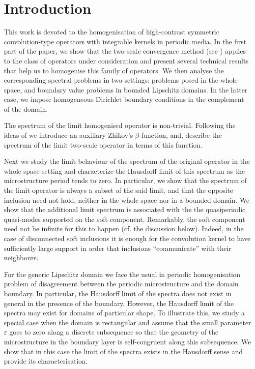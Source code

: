 \documentclass[11pt]{article}
\newcommand\e {\varepsilon}
\theoremstyle{remark}
\begin{document}
\tableofcontents

\section{Introduction}

This work is devoted to the homogenisation of high-contrast symmetric convolution-type operators with integrable kernels in periodic media. In the first part of the paper, we show that the two-scale convergence method (see \cite{Allaire}) applies to the class of operators under consideration and present several technical results  that help us to homogenise this family of operators. We then analyse the corresponding spectral problems in two settings: problems posed in the whole space, and boundary value problems in bounded Lipschitz domains. In the latter case, we impose homogeneous Dirichlet boundary conditions in the complement of the domain.

The  spectrum of the limit homogenised operator is non-trivial. Following the ideas of \cite{Zhikov2000} we introduce an auxiliary   Zhikov's $\beta$-function,  and,   describe the spectrum of the limit two-scale operator in terms of this function.

Next we study the limit behaviour of the spectrum of the original operator in the whole space setting and characterize the Hausdorff limit of this spectrum as the microstructure period tends to zero. In particular, we show that the spectrum of the limit operator is always a subset of the said limit, and that the opposite inclusion need not hold, neither in the whole space nor in a bounded domain. We show that the additional limit spectrum is associated with the the quasiperiodic quasi-modes supported on the soft component. Remarkably, the soft component need not be infinite for this to happen (cf. the discussion below). Indeed, in the case of disconnected soft inclusions it is enough for the convolution kernel to have sufficiently large support in order that inclusions ``communicate'' with their neighbours.

For the generic Lipschitz domain we face the usual in periodic homogenisation problem of disagreement between the periodic microstructure and the domain boundary. In particular, the Hausdorff limit of the spectra does not exist in general in the presence of the boundary. However, the Hausdorff limit of the spectra may exist for domains of particular shape.  To illustrate this, we study a special case when the domain is rectangular  and assume that the small parameter $\e$ goes to zero along a discrete subsequence so that the geometry of the microstructure in the boundary layer is self-congruent along this subsequence. We show that in this case the limit of the spectra exists in the Hausdorff  sense and provide its characterisation.
\end{document}
